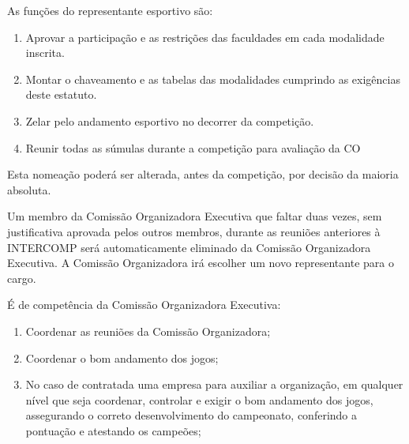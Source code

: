 \begin{article}
	\begin{xparagraph}
		As funções do representante esportivo são:
		\begin{enumerate}[noitemsep]
			\item Aprovar a participação e as restrições das faculdades em cada modalidade inscrita.
			\item Montar o chaveamento e as tabelas das modalidades cumprindo as exigências deste estatuto.
			\item Zelar pelo andamento esportivo no decorrer da competição.
			\item Reunir todas as súmulas durante a competição para avaliação da CO
		\end{enumerate}
	\end{xparagraph}

	\begin{xparagraph}
		Esta nomeação poderá ser alterada, antes da competição, por decisão da maioria absoluta.
	\end{xparagraph}

	\begin{xparagraph}
		Um membro da Comissão Organizadora Executiva que faltar duas vezes, sem justificativa aprovada pelos outros membros, durante as reuniões anteriores à INTERCOMP será automaticamente eliminado da Comissão Organizadora Executiva. A Comissão Organizadora irá escolher um novo representante para o cargo.
	\end{xparagraph}

	\begin{xparagraph}
		É de competência da Comissão Organizadora Executiva:
		\begin{enumerate}[noitemsep]
			\item Coordenar as reuniões da Comissão Organizadora;
			\item Coordenar o bom andamento dos jogos;
			\item No caso de contratada uma empresa para auxiliar a organização, em qualquer nível que seja coordenar, controlar e exigir o bom andamento dos jogos, assegurando o correto desenvolvimento do campeonato, conferindo a pontuação e atestando os campeões;
		\end{enumerate}
	\end{xparagraph}
\end{article}


